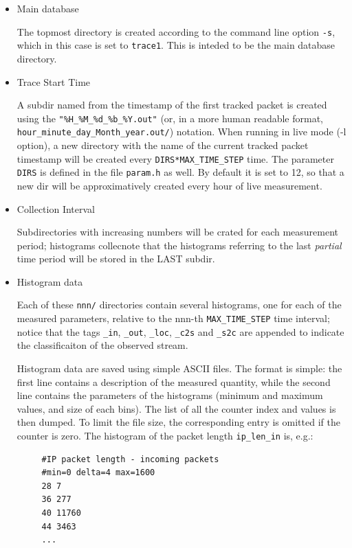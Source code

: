 \documentclass[11pt]{article}
\begin{document}
\begin{itemize}

\item Main database

The topmost directory is created according to the command line  option \texttt{-s},
which in this case is set to  \texttt{trace1}. This is inteded to be the main database
directory.


\item Trace Start Time

A subdir named from the timestamp of the first tracked packet is created using
the \texttt{"\%H\_\%M\_\%d\_\%b\_\%Y.out"} (or, in a more  human readable format, 
\texttt{hour\_minute\_day\_Month\_year.out/}) notation. When running in live mode (-l
option), a new directory with the name of the current tracked packet timestamp
will be created every \texttt{DIRS*MAX\_TIME\_STEP} time. The parameter \texttt{DIRS} is
defined in the file \texttt{param.h} as well. By default it is set to 12, so that a
new dir will be approximatively created every hour of live measurement.


\item Collection Interval

Subdirectories with increasing numbers will be crated for each measurement period;
histograms collecnote that the histograms referring to the last \textit{partial} time period will
be stored in the LAST subdir.


\item Histogram data

Each of these \texttt{nnn/}  directories contain several histograms, one for each of 
the measured parameters,  relative to the nnn-th \texttt{MAX\_TIME\_STEP} time interval;
notice that the tags \texttt{\_in}, \texttt{\_out}, \texttt{\_loc}, \texttt{\_c2s} and \texttt{\_s2c}
are appended to indicate the classificaiton of the observed stream.



Histogram data are saved using simple ASCII files.
The format is simple: the first line contains a description of the
measured quantity, while the second line contains the parameters of the histograms
(minimum and maximum values, and size of each bins). The list of all
the counter index and values is then dumped. To limit the file size, the
corresponding entry is omitted if the counter is zero.
The histogram of the packet length \texttt{ip\_len\_in} is, e.g.:

\begin{small}\begin{verbatim}
     #IP packet length - incoming packets
     #min=0 delta=4 max=1600
     28 7
     36 277
     40 11760
     44 3463
     ...
\end{verbatim}\end{small} \noindent
\end{itemize}
\end{document}
